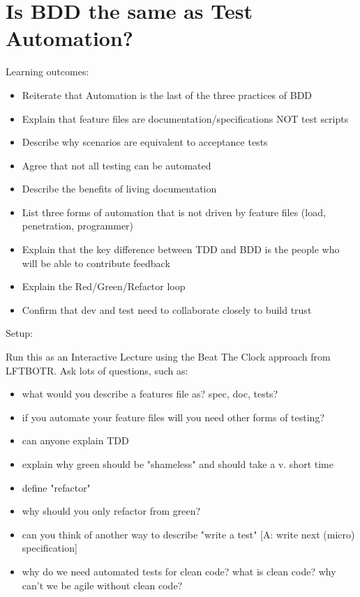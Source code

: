 
\chapter*{Is BDD the same as Test Automation?}

\ifnotes
    Learning outcomes:
    
    \begin{itemize}
        \item Reiterate that Automation is the last of the three practices of BDD
        \item Explain that feature files are documentation/specifications NOT test scripts
        \item Describe why scenarios are equivalent to acceptance tests
        \item Agree that not all testing can be automated
        \item Describe the benefits of living documentation
        \item List three forms of automation that is not driven by feature files (load, penetration, programmer)
        \item Explain that the key difference between TDD and BDD is the people who will be able to contribute feedback
        \item Explain the Red/Green/Refactor loop
        \item Confirm that dev and test need to collaborate closely to build trust
    \end{itemize}
    
    
    Setup:
    
        Run this as an Interactive Lecture using the Beat The Clock approach from LFTBOTR. Ask lots of questions, such as:
        
        \begin{itemize}
            \item what would you describe a features file as? spec, doc, tests?
            \item if you automate your feature files will you need other forms of testing?
            \item can anyone explain TDD
            \item explain why green should be "shameless" and should take a v. short time
            \item define "refactor"
            \item why should you only refactor from green?
            \item can you think of another way to describe "write a test" [A: write next (micro) specification]
            \item why do we need automated tests for clean code? what is clean code? why can't we be agile without clean code?
        \end{itemize}
        
